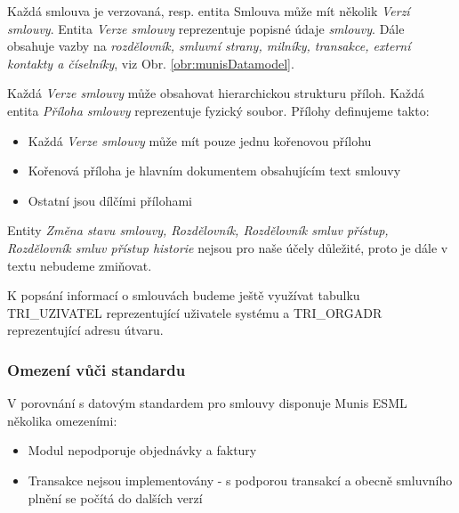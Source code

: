 Každá smlouva je verzovaná, resp. entita Smlouva může mít několik \textit{Verzí smlouvy}. Entita \textit{Verze smlouvy} reprezentuje popisné údaje \textit{smlouvy}. Dále obsahuje vazby na \textit{rozdělovník, smluvní strany, milníky, transakce, externí kontakty a číselníky}, viz Obr. \ref{obr:munisDatamodel}.

Každá \textit{Verze smlouvy} může obsahovat hierarchickou strukturu příloh. Každá entita \textit{Příloha smlouvy} reprezentuje fyzický soubor. Přílohy definujeme takto:

\begin{itemize}
\item Každá \textit{Verze smlouvy} může mít pouze jednu kořenovou přílohu
\item Kořenová příloha je hlavním dokumentem obsahujícím text smlouvy
\item Ostatní jsou dílčími přílohami
\end{itemize}

Entity \textit{Změna stavu smlouvy, Rozdělovník, Rozdělovník smluv přístup, Rozdělovník smluv přístup historie} nejsou pro naše účely důležité, proto je dále v textu nebudeme zmiňovat.

K popsání informací o smlouvách budeme ještě využívat tabulku TRI\_UZIVATEL reprezentující uživatele systému a TRI\_ORGADR reprezentující adresu útvaru. 

\subsubsection{Omezení vůči standardu}

V porovnání s datovým standardem pro smlouvy disponuje Munis ESML několika omezeními:

\begin{itemize}
\item Modul nepodporuje objednávky a faktury
\item Transakce nejsou implementovány - s podporou transakcí a obecně smluvního plnění se počítá do dalších verzí 
\end{itemize}

